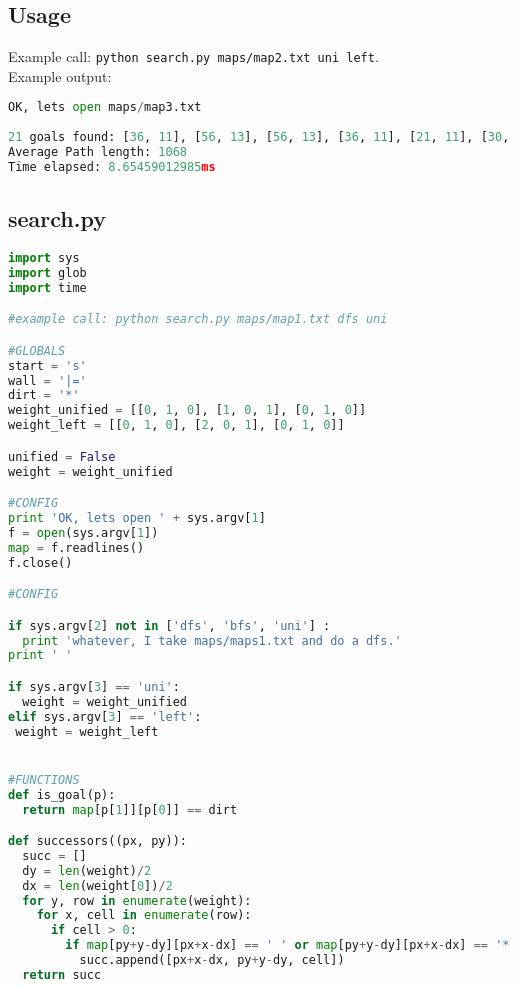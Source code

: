 \documentclass{scrreprt}
\begin{document}
\newpage
\begin{appendices} 
\chapter{Usage}
Example call: \texttt{python search.py maps/map2.txt uni left}.\\
Example output:\\

\begin{lstlisting}[language=Python]
OK, lets open maps/map3.txt
 
21 goals found: [36, 11], [56, 13], [56, 13], [36, 11], [21, 11], [30, 15], [21, 11], [4, 2], [4, 2], [29, 7], [29, 7], [52, 3], [52, 3], [82, 18], [82, 18], [136, 18], [136, 18], [114, 7], [114, 7], [101, 12], [137, 1], 
Average Path length: 1068
Time elapsed: 8.65459012985ms
\end{lstlisting}
\section{search.py}
\begin{lstlisting}[language=Python]
import sys
import glob
import time

#example call: python search.py maps/map1.txt dfs uni

#GLOBALS
start = 's'
wall = '|='
dirt = '*'
weight_unified = [[0, 1, 0], [1, 0, 1], [0, 1, 0]]
weight_left = [[0, 1, 0], [2, 0, 1], [0, 1, 0]]

unified = False
weight = weight_unified

#CONFIG
print 'OK, lets open ' + sys.argv[1]
f = open(sys.argv[1])
map = f.readlines()
f.close()

#CONFIG

if sys.argv[2] not in ['dfs', 'bfs', 'uni'] :
  print 'whatever, I take maps/maps1.txt and do a dfs.'
print ' '

if sys.argv[3] == 'uni':
  weight = weight_unified
elif sys.argv[3] == 'left':
 weight = weight_left


#FUNCTIONS
def is_goal(p):
  return map[p[1]][p[0]] == dirt

def successors((px, py)):
  succ = []
  dy = len(weight)/2
  dx = len(weight[0])/2
  for y, row in enumerate(weight):
    for x, cell in enumerate(row):
      if cell > 0:
       	if map[py+y-dy][px+x-dx] == ' ' or map[py+y-dy][px+x-dx] == '*':
          succ.append([px+x-dx, py+y-dy, cell])
  return succ 


\end{lstlisting}
\end{appendices}
\end{document}
